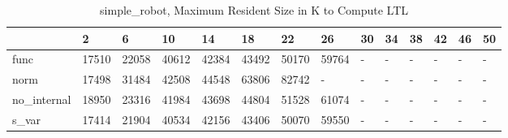 \begin{table}
\caption{simple_robot, Maximum Resident Size in K to Compute LTL}
\label{simple_robot_LTL_size}
\begin{tabular}{llllllllllllll}
\toprule
 & 2 & 6 & 10 & 14 & 18 & 22 & 26 & 30 & 34 & 38 & 42 & 46 & 50 \\
\midrule
func & 17510 & 22058 & 40612 & 42384 & 43492 & 50170 & 59764 & - & - & - & - & - & - \\
norm & 17498 & 31484 & 42508 & 44548 & 63806 & 82742 & - & - & - & - & - & - & - \\
no_internal & 18950 & 23316 & 41984 & 43698 & 44804 & 51528 & 61074 & - & - & - & - & - & - \\
s_var & 17414 & 21904 & 40534 & 42156 & 43406 & 50070 & 59550 & - & - & - & - & - & - \\
\bottomrule
\end{tabular}
\end{table}
